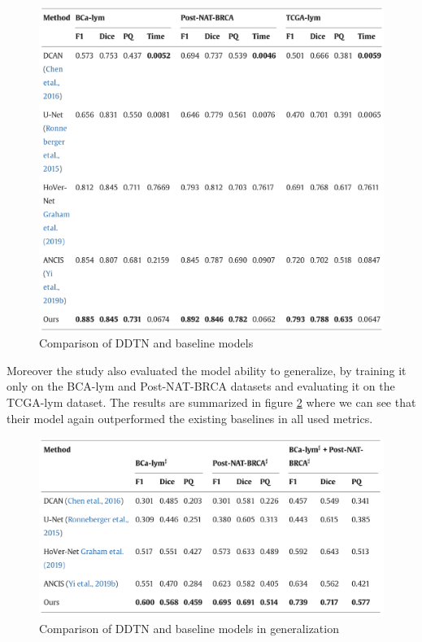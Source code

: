 \begin{figure}[H]
    \begin{centering}
    \includegraphics[width=14cm]{assets/images/rw-ddtn-results.png}
    \par\end{centering}
    \caption{Comparison of DDTN and baseline models}
    \label{fig:rw-ddtn-results}
\end{figure}

Moreover the study also evaluated the model ability to generalize, by training it only on the BCA-lym and Post-NAT-BRCA datasets and evaluating it on the TCGA-lym dataset. The results are summarized in figure \ref{fig:rw-ddtn-generalize} where we can see that their model again outperformed the existing baselines in all used metrics.

\begin{figure}[H]
    \begin{centering}
    \includegraphics[width=14cm]{assets/images/rw-ddtn-generalize.png}
    \par\end{centering}
    \caption{Comparison of DDTN and baseline models in generalization}
    \label{fig:rw-ddtn-generalize}
\end{figure}

